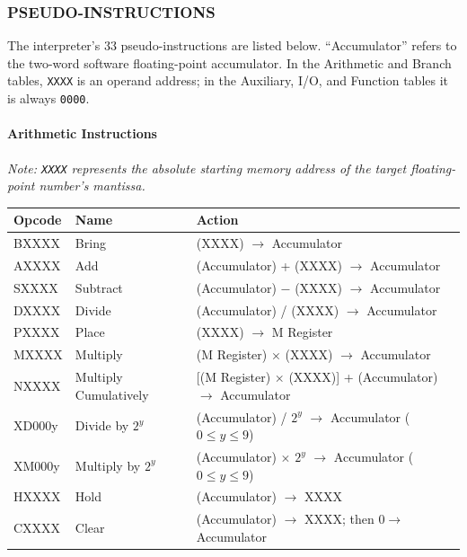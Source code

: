 \subsubsection*{PSEUDO-INSTRUCTIONS}

The interpreter's 33 pseudo-instructions are listed below. ``Accumulator'' refers to the two-word software floating-point accumulator. In the Arithmetic and Branch tables, \texttt{XXXX} is an operand address; in the Auxiliary, I/O, and Function tables it is always \texttt{0000}.

\paragraph{Arithmetic Instructions}
\textit{Note: \texttt{XXXX} represents the absolute starting memory address of the target floating-point number's mantissa.}

\begin{table}[h]
\centering
\small
\ttfamily
\begin{tabularx}{\textwidth}{llX}
\toprule
\textbf{Opcode} & \textbf{Name} & \textbf{Action} \\ 
\midrule
BXXXX & Bring & (XXXX) $\rightarrow$ Accumulator \\
AXXXX & Add & (Accumulator) + (XXXX) $\rightarrow$ Accumulator \\
SXXXX & Subtract & (Accumulator) $-$ (XXXX) $\rightarrow$ Accumulator \\
DXXXX & Divide & (Accumulator) / (XXXX) $\rightarrow$ Accumulator \\
PXXXX & Place & (XXXX) $\rightarrow$ M Register \\
MXXXX & Multiply & (M Register) $\times$ (XXXX) $\rightarrow$ Accumulator \\
NXXXX & Multiply Cumulatively & [(M Register) $\times$ (XXXX)] + (Accumulator) $\rightarrow$ Accumulator \\
XD000y & Divide by $2^y$ & (Accumulator) / $2^y$ $\rightarrow$ Accumulator \hfill ($0 \le y \le 9$) \\
XM000y & Multiply by $2^y$ & (Accumulator) $\times$ $2^y$ $\rightarrow$ Accumulator \hfill ($0 \le y \le 9$) \\
HXXXX & Hold & (Accumulator) $\rightarrow$ XXXX \\
CXXXX & Clear & (Accumulator) $\rightarrow$ XXXX; then $0 \rightarrow$ Accumulator \\
\bottomrule
\end{tabularx}
\end{table}

